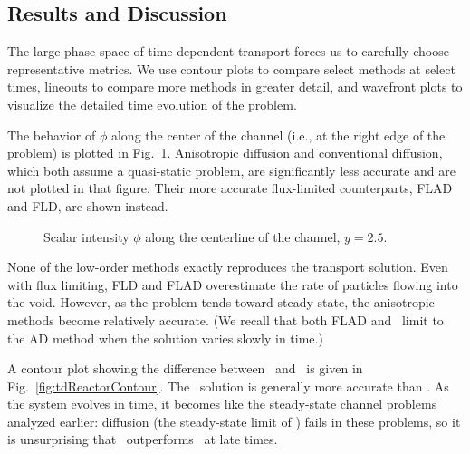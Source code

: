 \subsection{Results and Discussion}

The large phase space of time-dependent transport forces us to carefully choose
representative metrics. We use contour plots to compare select methods at
select times, lineouts to compare more methods in greater detail, and wavefront
plots to visualize the detailed time evolution of the problem.

The behavior of $\phi$ along the center of the channel (i.e., at the
right edge of the problem) is plotted in Fig.~\ref{fig:tdReactor}. Anisotropic
diffusion and conventional diffusion, which both assume a quasi-static problem,
are significantly less accurate and are not plotted in that figure. Their
more accurate flux-limited counterparts, FLAD and FLD, are shown instead.

\begin{figure}[htb]
  \centering\small
  \subfloat[$t=2$]{%
    \hspace{-.25in}%
    }%
  \subfloat[$t=5$]{%
    \hspace{-.25in}%
    }

  \subfloat[$t=10$]{%
    \hspace{-.25in}%
    }%
  \subfloat[$t=15$]{%
    \hspace{-.25in}%
    }

  \caption{Scalar intensity $\phi$ along the centerline of the channel, $y=2.5$.}
  \label{fig:tdReactor}
\end{figure}

None of the low-order methods exactly reproduces the transport solution. Even
with flux
limiting, FLD and FLAD overestimate the rate of particles flowing into the void.
However, as the problem tends toward steady-state, the anisotropic
methods become relatively accurate. (We recall that both FLAD and \APone\ limit
to the AD method when the solution varies slowly in time.)

A contour plot showing the difference between \Pone\ and \APone\ is given in
Fig.~\ref{fig:tdReactorContour}. The \APone\ solution is generally more accurate
than \Pone. As the system evolves in time, it becomes like the steady-state
channel problems analyzed earlier: diffusion (the steady-state limit of \Pone)
fails in these problems, so it is unsurprising that \APone\ outperforms \Pone\
at late times.

